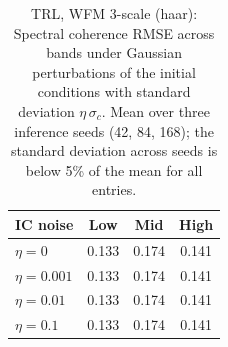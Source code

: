 \begin{table}[ht]
\centering
\caption{TRL, WFM 3-scale (haar): Spectral coherence RMSE across bands under Gaussian perturbations of the initial conditions with standard deviation $\eta\,\sigma_c$. Mean over three inference seeds (42, 84, 168); the standard deviation across seeds is below 5\% of the mean for all entries.}
\label{tab:ic_pert_spectral}
\begin{tabular}{lccc}
\toprule
IC noise & Low & Mid & High \\
\midrule
$\eta=0$ & 0.133 & 0.174 & 0.141 \\
$\eta=0.001$ & 0.133 & 0.174 & 0.141 \\
$\eta=0.01$ & 0.133 & 0.174 & 0.141 \\
$\eta=0.1$ & 0.133 & 0.174 & 0.141 \\
\bottomrule
\end{tabular}
\end{table}
